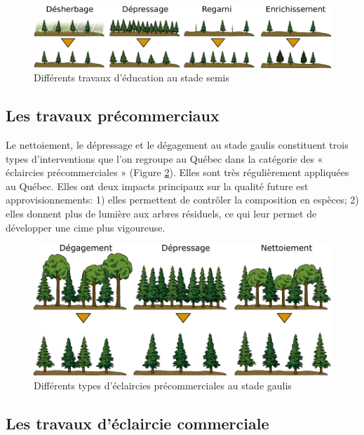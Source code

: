 \begin{figure}[!h]
	\centering
	\includegraphics[width=1\linewidth]{./img/ch8_debrous}
	\caption{Différents travaux d'éducation au stade semis}
	\label{fig:debrous}
\end{figure}



\subsection{Les travaux précommerciaux}

Le nettoiement, le dépressage et le dégagement  au stade gaulis constituent trois types d'interventions que l'on regroupe au Québec dans la catégorie des « éclaircies précommerciales » (Figure \ref{fig:precom}). Elles sont très régulièrement appliquées au Québec. Elles ont deux impacts principaux sur la qualité future est approvisionnements: 1) elles permettent de contrôler la composition en espèces; 2) elles donnent plus de lumière aux arbres résiduels, ce qui leur permet de développer une cime plus vigoureuse.\\

\begin{figure}[!h]
	\centering
	\includegraphics[width=1\linewidth]{./img/ch8_precom}
	\caption{Différents types d'éclaircies précommerciales au stade gaulis}
	\label{fig:precom}
\end{figure}

\subsection{Les travaux d'éclaircie commerciale}\label{ecomm}


